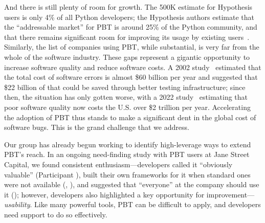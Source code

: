 And there is still plenty of room
for growth.
The 500K estimate for
Hypothesis users is only 4\% of all Python developers; the Hypothesis
authors estimate that the ``addressable market'' for PBT is around
25\% of the Python
community, and that there remains significant room for
improving its usage by existing users~\cite{ZacPersonalCommunication,noauthor_python_nodate}.
Similarly, the list of
companies using PBT, while substantial, is very far from the whole of the software
industry.
These gaps represent a gigantic opportunity to increase software quality
and reduce software costs.
A 2002 study~\cite{2002economic} estimated that the total cost of software errors is almost
\$60 billion per year and suggested that \$22 billion of that could be
saved through
better testing infrastructure; since then, the situation has only gotten worse, with a 2022
study~\cite{krasner2022cost} estimating that poor software quality now
costs the U.S.{} over \$2 trillion per
year. Accelerating the adoption of PBT thus stands to make a
significant dent
in the global cost of software bugs.  This is the grand challenge that
we address.

Our group has already begun working to identify
high-leverage ways to extend PBT's reach.
In an ongoing need-finding study with PBT users at Jane Street
Capital, we found consistent enthusiasm---developers called it
``obviously valuable'' (Participant ), built their own
frameworks for it when standard ones were not available
(, ), and suggested that ``everyone''
at the company should use it (); however, developers
also highlighted a key opportunity for improvement---{\em usability}.
%
Like
many powerful tools, PBT can be difficult to apply, and developers
need support to do so effectively.


